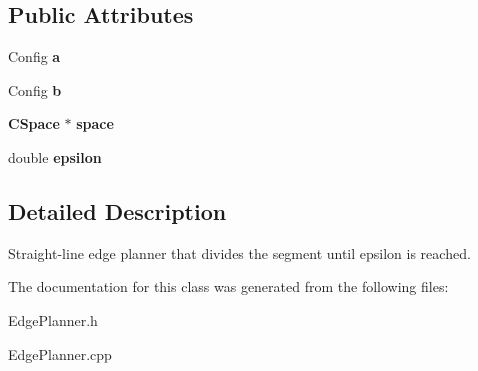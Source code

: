 \subsection*{Public Attributes}
\begin{DoxyCompactItemize}
\item 
Config {\bfseries a}\label{classStraightLineEpsilonPlanner_a283302b601941f0570e007e2ea601eb6}

\item 
Config {\bfseries b}\label{classStraightLineEpsilonPlanner_aa5b324ce8a64dfd718464cbd4cfc7f97}

\item 
{\bf C\+Space} $\ast$ {\bfseries space}\label{classStraightLineEpsilonPlanner_af53624bcda4e4449667b70142bde4dc5}

\item 
double {\bfseries epsilon}\label{classStraightLineEpsilonPlanner_a1d69f13d62136ef826b90847c9f2e243}

\end{DoxyCompactItemize}


\subsection{Detailed Description}
Straight-\/line edge planner that divides the segment until epsilon is reached. 

The documentation for this class was generated from the following files\+:\begin{DoxyCompactItemize}
\item 
Edge\+Planner.\+h\item 
Edge\+Planner.\+cpp\end{DoxyCompactItemize}
